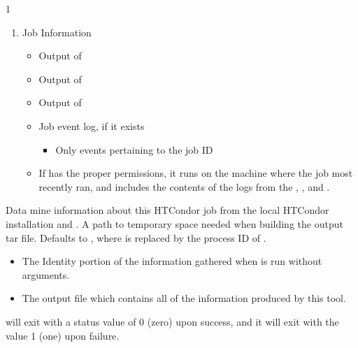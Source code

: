 \begin{ManPage}{\label{man-condor-gather-info}}{1}
\begin{enumerate}
\begin{itemize}
\begin{itemize}
		  \end{itemize}
	\end{itemize}
	\item Job Information
	\begin{itemize}
    	\item Output of 
    	\item Output of 
    	\item Output of 
    	\item Job event log, if it exists
		\begin{itemize}
          	\item Only events pertaining to the job ID 
		\end{itemize}
    	\item If  has the proper permissions,
it runs  on the machine where the job most recently ran,
and includes the contents of the logs from the ,
, and .
	\end{itemize}
\end{enumerate}

\begin{Options}
  {Data mine information about this HTCondor job from the local 
  HTCondor installation and .}
  {A path to temporary space needed when building the output tar file.
  Defaults to , where  is replaced by
  the process ID of .}
\end{Options}

\Files

\begin{itemize}
  \item{} The Identity portion of the information 
  gathered when  is run without arguments.

  \item{} The output file which contains all of 
  the information produced by this tool.
\end{itemize}

\ExitStatus

 will exit with a status value of 0 (zero) upon success,
and it will exit with the value 1 (one) upon failure.

\end{ManPage}
